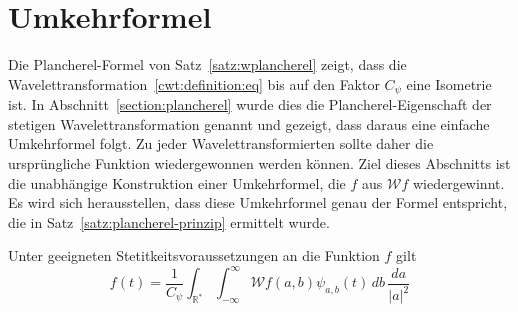 %
%
%
\section{Umkehrformel%
\label{section:cwt:umkehrformel}}
Die Plancherel-Formel von Satz~\ref{satz:wplancherel} zeigt, dass die
Wavelettransformation~\eqref{cwt:definition:eq} bis auf den Faktor
$C_{\psi}$ eine Isometrie ist.
In Abschnitt~\ref{section:plancherel} wurde dies die Plancherel-Eigenschaft
der stetigen Wavelettransformation genannt und gezeigt, dass daraus
eine einfache Umkehrformel folgt.
Zu jeder Wavelettransformierten sollte daher die ursprüngliche
Funktion wiedergewonnen werden können.
Ziel dieses Abschnitts ist die unabhängige Konstruktion einer Umkehrformel, 
die $f$ aus $\mathcal{W}f$ wiedergewinnt.
Es wird sich herausstellen, dass diese Umkehrformel genau der Formel
entspricht, die in Satz~\ref{satz:plancherel-prinzip} ermittelt wurde.

\begin{satz}
Unter geeigneten Stetitkeitsvoraussetzungen an die Funktion $f$ gilt
\begin{equation}
f(t) = \frac{1}{C_{\psi}}\int_{\mathbb R^*}\int_{-\infty}^\infty
\mathcal{W}f(a,b) \psi_{a,b}(t)
\,db\,\frac{da}{|a|^2}
\label{cwt:umkehr}
\end{equation}
\end{satz}

